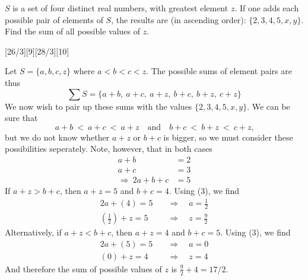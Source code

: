 \documentclass[12pt]{article}
\newcounter{problem}
\begin{document}
\begin{problem}
   $S$ is a set of four distinct real numbers, with greatest element $z$. If one adds each possible pair of elements of $S$, the results are (in ascending order): $\{2, 3, 4, 5, x, y\}$. Find the sum of all possible values of $z$.  
\end{problem}
[26/3][9][28/3][10]
\begin{solution}[A]
   Let $S=\{a,b,c,z\}$ where $a<b<c<z$. The possible sums of element pairs are thus
    \[{\textstyle\sum} S=\{a+b,\ a+c,\ a+z,\ b+c,\ b+z,\ c+z\}\]
    We now wish to pair up these sums with the values $\{2, 3, 4, 5, x, y\}$. We can be sure that \[a+b\ <\ a+c\ <\ a+z \quad \text{and}\quad b+c\ <\ b+z\ <\ c+z\text{,}\]but we do not know whether $a+z$ or $b+c$ is bigger, so we must consider these possibilities seperately. Note, however, that in both cases
    \begin{align}
        a+b &= 2 \\
        a+c &= 3 \\
        \Rightarrow\ 2a+b+c &= 5
    \end{align}
    If $a+z > b+c$, then $a+z = 5$ and $b+c = 4$. Using (3), we find
    \begin{align*}
        2a+(4) = 5 \quad &\Rightarrow \quad a=\frac{1}{2} \\[2mm]
        \left(\frac{1}{2}\right) + z = 5 \quad &\Rightarrow \quad z=\frac{9}{2}
    \end{align*}
    Alternatively, if $a+z < b+c$, then $a+z = 4$ and $b+c = 5$. Using (3), we find
    \begin{align*}
        2a + (5) = 5 \quad &\Rightarrow \quad a=0 \\[2mm]
        (0) + z = 4 \quad &\Rightarrow \quad z=4
    \end{align*}
    And therefore the sum of possible values of $z$ is $\frac{9}{2} + 4 = \boxed{17/2}$.
\end{solution}
\end{document}
